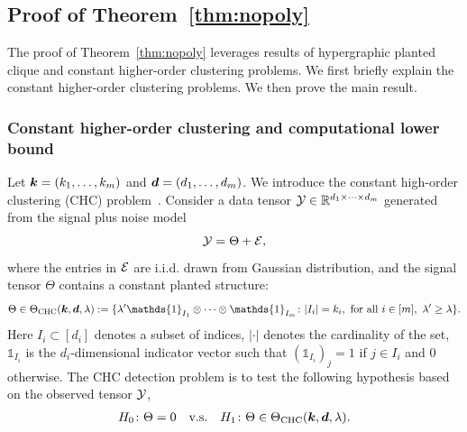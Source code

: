\documentclass[12pt]{article}
\theoremstyle{definition}
\begin{document}
{\color{blue}
\subsection{Proof of Theorem~\ref{thm:nopoly}}\label{sec:nopoly}
The proof of Theorem~\ref{thm:nopoly} leverages results of hypergraphic planted clique and constant higher-order clustering problems. We first briefly explain the constant higher-order clustering problems. We then prove the main result.

 
 
\subsubsection{Constant higher-order clustering and computational lower bound}  
Let $\bm{k} = (k_1,\ldots,k_m)$ and $\bm{d} = (d_1,\ldots,d_m)$. We introduce the constant high-order clustering (CHC) problem~\citep{luo2022tensor}. Consider a data tensor $\mathcal{Y}\in\mathbb{R}^{d_1\times \cdots \times d_m}$ generated from the signal plus noise model
\begin{equation}\label{eq:gaussian}
\mathcal{Y}=\Theta+\mathcal{E}, 
\end{equation}
where the entries in $\mathcal{E}$ are i.i.d. drawn from Gaussian distribution, and the signal tensor $\Theta$ contains a constant planted structure:
\begin{align}\label{eq:chcdef}
    \Theta\in\Theta_{\text{CHC}}(\mk,\md,\lambda) :=\{\lambda'\mathds{1}_{I_1}\otimes \cdots\otimes \mathds{1}_{I_m}\colon|I_i| = k_i,\ \text{for all }i\in[m],\ \lambda' \geq \lambda\}.
\end{align}
Here $I_i\subset [d_i]$ denotes a subset of indices, $|\cdot|$ denotes the cardinality of the set, $\mathds{1}_{I_i}$ is the $d_i$-dimensional indicator vector such that $(\mathds{1}_{I_i})_j = 1$ if $j\in I_i$ and 0 otherwise. The CHC detection problem is to test the following hypothesis based on the observed tensor $\mathcal{Y}$, 
\begin{align}\label{eq:chct}
    H_0\colon \Theta = 0\quad\text{v.s.}\quad H_1\colon \Theta\in\Theta_{\text{CHC}}(\bm{k},\bm{d},\lambda).
\end{align}

}
\end{document}
